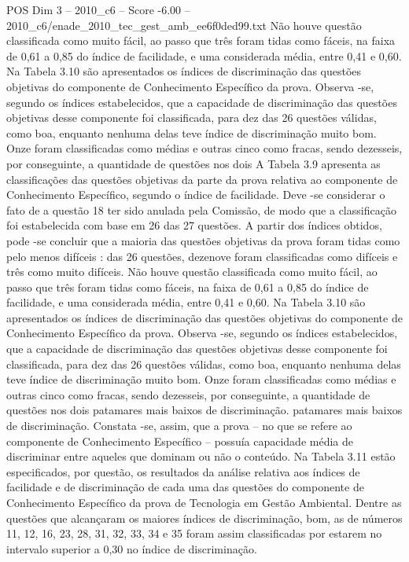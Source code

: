 \begin{textsample}{POS Dim 3 – 2010\_c6 – Score -6.00 – 2010\_c6/enade\_2010\_tec\_gest\_amb\_ee6f0ded99.txt}
Não houve questão classificada como muito fácil, ao passo que três foram tidas como fáceis, na faixa de 0,61 a 0,85 do índice de facilidade, e uma considerada média, entre 0,41 e 0,60.
Na Tabela 3.10 são apresentados os índices de discriminação das questões objetivas do componente de Conhecimento Específico da prova.
Observa -se, segundo os índices estabelecidos, que a capacidade de discriminação das questões objetivas desse componente foi classificada, para dez das 26 questões válidas, como boa, enquanto nenhuma delas teve índice de discriminação muito bom.
Onze foram classificadas como médias e outras cinco como fracas, sendo dezesseis, por conseguinte, a quantidade de questões nos dois A Tabela 3.9 apresenta as classificações das questões objetivas da parte da prova relativa ao componente de Conhecimento Específico, segundo o índice de facilidade.
Deve -se considerar o fato de a questão 18 ter sido anulada pela Comissão, de modo que a classificação foi estabelecida com base em 26 das 27 questões.
A partir dos índices obtidos, pode -se concluir que a maioria das questões objetivas da prova foram tidas como pelo menos difíceis : das 26 questões, dezenove foram classificadas como difíceis e três como muito difíceis.
Não houve questão classificada como muito fácil, ao passo que três foram tidas como fáceis, na faixa de 0,61 a 0,85 do índice de facilidade, e uma considerada média, entre 0,41 e 0,60.
Na Tabela 3.10 são apresentados os índices de discriminação das questões objetivas do componente de Conhecimento Específico da prova.
Observa -se, segundo os índices estabelecidos, que a capacidade de discriminação das questões objetivas desse componente foi classificada, para dez das 26 questões válidas, como boa, enquanto nenhuma delas teve índice de discriminação muito bom.
Onze foram classificadas como médias e outras cinco como fracas, sendo dezesseis, por conseguinte, a quantidade de questões nos dois patamares mais baixos de discriminação. patamares mais baixos de discriminação.
Constata -se, assim, que a prova – no que se refere ao componente de Conhecimento Específico – possuía capacidade média de discriminar entre aqueles que dominam ou não o conteúdo.
Na Tabela 3.11 estão especificados, por questão, os resultados da análise relativa aos índices de facilidade e de discriminação de cada uma das questões do componente de Conhecimento Específico da prova de Tecnologia em Gestão Ambiental.
Dentre as questões que alcançaram os maiores índices de discriminação, bom, as de números 11, 12, 16, 23, 28, 31, 32, 33, 34 e 35 foram assim classificadas por estarem no intervalo superior a 0,30 no índice de discriminação.

\end{textsample}
